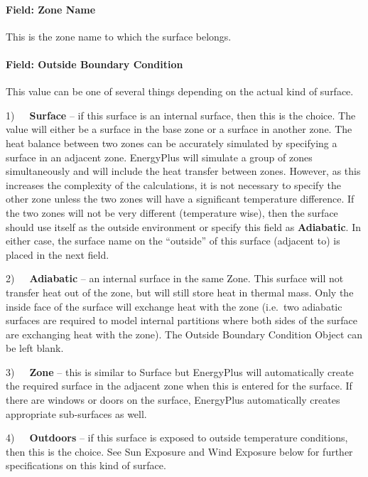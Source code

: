 \paragraph{Field: Zone Name}\label{field-zone-name-13}

This is the zone name to which the surface belongs.

\paragraph{Field: Outside Boundary Condition}\label{field-outside-boundary-condition-3}

This value can be one of several things depending on the actual kind of surface.

1)~~~\textbf{Surface} -- if this surface is an internal surface, then this is the choice. The value will either be a surface in the base zone or a surface in another zone. The heat balance between two zones can be accurately simulated by specifying a surface in an adjacent zone. EnergyPlus will simulate a group of zones simultaneously and will include the heat transfer between zones. However, as this increases the complexity of the calculations, it is not necessary to specify the other zone unless the two zones will have a significant temperature difference. If the two zones will not be very different (temperature wise), then the surface should use itself as the outside environment or specify this field as \textbf{Adiabatic}. In either case, the surface name on the ``outside'' of this surface (adjacent to) is placed in the next field.

2)~~~\textbf{Adiabatic} -- an internal surface in the same Zone. This surface will not transfer heat out of the zone, but will still store heat in thermal mass. Only the inside face of the surface will exchange heat with the zone (i.e.~two adiabatic surfaces are required to model internal partitions where both sides of the surface are exchanging heat with the zone). The Outside Boundary Condition Object can be left blank.

3)~~~\textbf{Zone} -- this is similar to Surface but EnergyPlus will automatically create the required surface in the adjacent zone when this is entered for the surface. If there are windows or doors on the surface, EnergyPlus automatically creates appropriate sub-surfaces as well.

4)~~~\textbf{Outdoors} -- if this surface is exposed to outside temperature conditions, then this is the choice. See Sun Exposure and Wind Exposure below for further specifications on this kind of surface.

